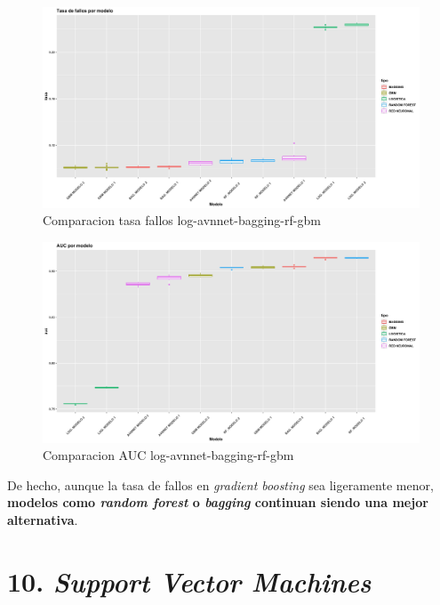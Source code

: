 \documentclass[
]{article}
\begin{document}
\begin{figure}[h!]

{\centering \includegraphics[width=0.99\linewidth,height=0.99\textheight,]{./charts/comparativas/05_log_avnnet_bagging_rf_gbm_tasa} 

}

\caption{Comparacion tasa fallos log-avnnet-bagging-rf-gbm}\label{fig:unnamed-chunk-113}
\end{figure}
\begin{figure}[h!]

{\centering \includegraphics[width=0.99\linewidth,height=0.99\textheight,]{./charts/comparativas/05_log_avnnet_bagging_rf_gbm_auc} 

}

\caption{Comparacion AUC log-avnnet-bagging-rf-gbm}\label{fig:unnamed-chunk-114}
\end{figure}

De hecho, aunque la tasa de fallos en \emph{gradient boosting} sea
ligeramente menor, \textbf{modelos como \emph{random forest} o
\emph{bagging} continuan siendo una mejor alternativa}.

\hypertarget{support-vector-machines}{%
\section{\texorpdfstring{10. \emph{Support Vector
Machines}}{10. Support Vector Machines}}\label{support-vector-machines}}
\end{document}

